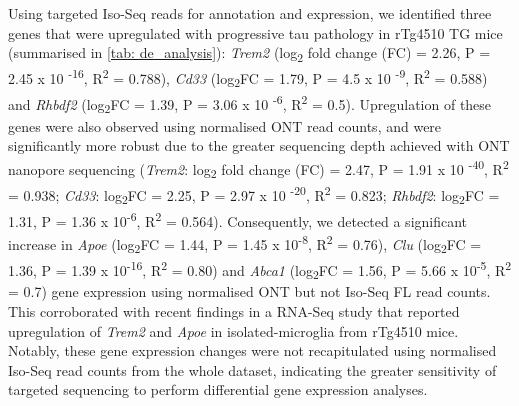 Using targeted Iso-Seq reads for annotation and expression, we identified three genes that were upregulated with progressive tau pathology in rTg4510 TG mice (summarised in \cref{tab: de_analysis}): \textit{Trem2} (log\textsubscript{2} fold change (FC) = 2.26, P = 2.45 x 10 \textsuperscript{-16}, R\textsuperscript{2} = 0.788), \textit{Cd33} (log\textsubscript{2}FC = 1.79, P = 4.5 x 10 \textsuperscript{-9}, R\textsuperscript{2} = 0.588) and \textit{Rhbdf2} (log\textsubscript{2}FC = 1.39, P = 3.06 x 10 \textsuperscript{-6}, R\textsuperscript{2} = 0.5). Upregulation of these genes were also observed using normalised ONT read counts, and were significantly more robust due to the greater sequencing depth achieved with ONT nanopore sequencing (\textit{Trem2}: log\textsubscript{2} fold change (FC) = 2.47, P = 1.91 x 10 \textsuperscript{-40}, R\textsuperscript{2} = 0.938; \textit{Cd33}: log\textsubscript{2}FC = 2.25, P = 2.97 x 10 \textsuperscript{-20}, R\textsuperscript{2} = 0.823; \textit{Rhbdf2}: log\textsubscript{2}FC = 1.31, P = 1.36 x 10\textsuperscript{-6}, R\textsuperscript{2} = 0.564). Consequently, we detected a significant increase in \textit{Apoe} (log\textsubscript{2}FC = 1.44, P = 1.45 x 10\textsuperscript{-8},  R\textsuperscript{2} = 0.76), \textit{Clu} (log\textsubscript{2}FC = 1.36, P = 1.39 x 10\textsuperscript{-16}, R\textsuperscript{2} = 0.80) and \textit{Abca1} (log\textsubscript{2}FC = 1.56, P = 5.66 x 10\textsuperscript{-5}, R\textsuperscript{2} = 0.7) gene expression using normalised ONT but not Iso-Seq FL read counts. This corroborated with recent findings in a RNA-Seq study that reported upregulation of \textit{Trem2} and \textit{Apoe} in isolated-microglia from rTg4510 mice\cite{Sobue2021}. Notably, these gene expression changes were not recapitulated using normalised Iso-Seq read counts from the whole dataset, indicating the greater sensitivity of targeted sequencing to perform differential gene expression analyses. 

